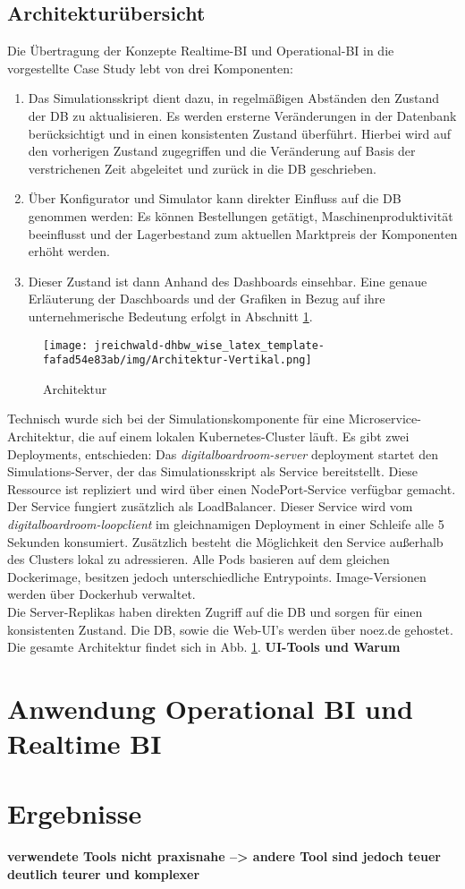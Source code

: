 \subsection{Architekturübersicht}
Die Übertragung der Konzepte Realtime-\ac{BI} und Operational-\ac{BI} in die vorgestellte Case Study lebt von drei Komponenten: 
\begin{enumerate}
    \item Das Simulationsskript dient dazu, in regelmäßigen Abständen den Zustand der \ac{DB} zu aktualisieren. Es werden ersterne Veränderungen in der Datenbank berücksichtigt und in einen konsistenten Zustand überführt. Hierbei wird auf den vorherigen Zustand zugegriffen und die Veränderung auf Basis der verstrichenen Zeit abgeleitet und zurück in die \ac{DB} geschrieben.
    \item Über Konfigurator und Simulator kann direkter Einfluss auf die \ac{DB} genommen werden: Es können Bestellungen getätigt, Maschinenproduktivität beeinflusst und der Lagerbestand zum aktuellen Marktpreis der Komponenten erhöht werden.
    \item Dieser Zustand ist dann Anhand des Dashboards einsehbar. Eine genaue Erläuterung der Daschboards und der Grafiken in Bezug auf ihre unternehmerische Bedeutung erfolgt in Abschnitt \ref{abs:anwOP}.
\end{enumerate}
\begin{figure}[h]
    \centering
    \texttt{[image: jreichwald-dhbw\_wise\_latex\_template-fafad54e83ab/img/Architektur-Vertikal.png]}
    \caption{Architektur}
    \label{fig:arch}
\end{figure}
Technisch wurde sich bei der Simulationskomponente für eine Microservice-Architektur, die auf einem lokalen Kubernetes-Cluster läuft. Es gibt zwei Deployments, entschieden: Das \textit{digitalboardroom-server} deployment startet den Simulations-Server, der das Simulationsskript als Service bereitstellt. Diese Ressource ist repliziert und wird über einen NodePort-Service verfügbar gemacht. Der Service fungiert zusätzlich als LoadBalancer. Dieser Service wird vom \textit{digitalboardroom-loopclient} im gleichnamigen Deployment in einer Schleife alle 5 Sekunden konsumiert. Zusätzlich besteht die Möglichkeit den Service außerhalb des Clusters lokal zu adressieren. Alle Pods basieren auf dem gleichen Dockerimage, besitzen jedoch unterschiedliche Entrypoints. Image-Versionen werden über Dockerhub verwaltet.
\\Die Server-Replikas haben direkten Zugriff auf die \ac{DB} und sorgen für einen konsistenten Zustand.
Die \ac{DB}, sowie die Web-UI's werden über noez.de gehostet. Die gesamte Architektur findet sich in Abb. \ref{fig:arch}.
\textbf{UI-Tools und Warum}

\section{Anwendung Operational BI und Realtime BI} \label{abs:anwOP}
\section{Ergebnisse}
\textbf{verwendete Tools nicht praxisnahe --> andere Tool sind jedoch teuer deutlich teurer und komplexer}